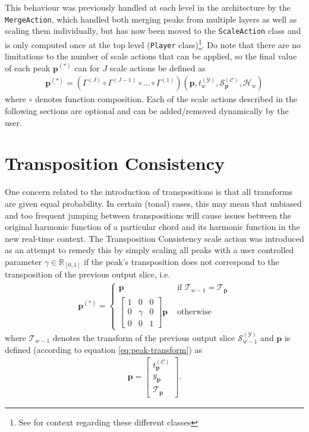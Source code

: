 	
This behaviour was previously handled at each level in the architecture by the \texttt{MergeAction}, which handled both merging peaks from multiple layers as well as scaling them individually, but has now been moved to the \texttt{ScaleAction} class and is only computed once at the top level (\texttt{Player} class)\footnote{See \cite{somaxsoftware2021} for context regarding these different classes}. Do note that there are no limitations to the number of scale actions that can be applied, so the final value of each peak $\bm  p^{(\ast)}$ can for $J$ scale actions be defined as
	\begin{align}
		\bm p^{(\ast)} = \left(\Gamma^{(J)} \circ \Gamma^{(J-1)} \circ \dots \circ \Gamma^{(1)} \right)\left(\bm p, t^{(\mathcal Y)}_w, \mathcal S^{(\mathcal C)}_{\bm p}, \mathcal H_w\right)
	\end{align}
	where $\circ$ denotes function composition. Each of the scale actions described in the following sections are optional and can be added/removed dynamically by the user.

\section{Transposition Consistency}
One concern related to the introduction of transpositions is that all transforms are given equal probability. In certain (tonal) cases, this may mean that unbiased and too frequent jumping between transpositions will cause issues between the original harmonic function of a particular chord and its harmonic function in the new real-time context. The Transposition Consistency scale action was introduced as an attempt to remedy this by simply scaling all peaks with a user controlled parameter $\gamma \in \mathbb R_{[0, 1]}$ if the peak's transposition does not correspond to the transposition of the previous output slice, i.e.
	\begin{align}
		\bm p^{(\ast)} = \left\lbrace\begin{array}{cl}
				\bm p & \text{ if } \mathcal T_{w-1} = \mathcal T_{\bm p}\\
				\begin{bmatrix} 
					1 & 0 & 0 \\
					0 & \gamma & 0\\
					0 & 0 & 1
				\end{bmatrix} \bm p & \text{ otherwise}
			\end{array}\right.
	\end{align}
	where $\mathcal T_{w-1}$ denotes the transform of the previous output slice $\mathcal S^{(\mathcal Y)}_{w-1}$ and $\bm p$ is defined (according to equation \ref{eq:peak-transform}) as
	\begin{align}
		\bm p = \begin{bmatrix} 
			t^{(\mathcal C)}_{\bm p} \\ y_{\bm p} \\ \mathcal T_{\bm p} 
		\end{bmatrix}.
	\end{align}



